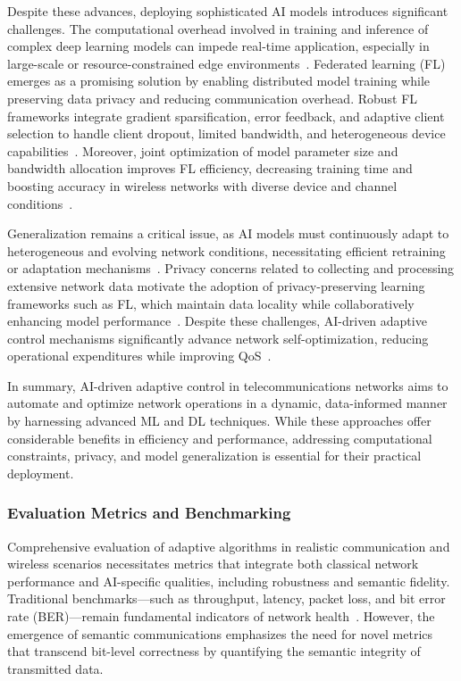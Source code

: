 \documentclass[sigconf]{acmart}
\begin{document}
Despite these advances, deploying sophisticated AI models introduces significant challenges. The computational overhead involved in training and inference of complex deep learning models can impede real-time application, especially in large-scale or resource-constrained edge environments~\cite{ref4,ref5}. Federated learning (FL) emerges as a promising solution by enabling distributed model training while preserving data privacy and reducing communication overhead. Robust FL frameworks integrate gradient sparsification, error feedback, and adaptive client selection to handle client dropout, limited bandwidth, and heterogeneous device capabilities~\cite{ref4}. Moreover, joint optimization of model parameter size and bandwidth allocation improves FL efficiency, decreasing training time and boosting accuracy in wireless networks with diverse device and channel conditions~\cite{ref5}. 

Generalization remains a critical issue, as AI models must continuously adapt to heterogeneous and evolving network conditions, necessitating efficient retraining or adaptation mechanisms~\cite{ref7}. Privacy concerns related to collecting and processing extensive network data motivate the adoption of privacy-preserving learning frameworks such as FL, which maintain data locality while collaboratively enhancing model performance~\cite{ref10,ref11}. Despite these challenges, AI-driven adaptive control mechanisms significantly advance network self-optimization, reducing operational expenditures while improving QoS~\cite{ref14,ref50}.

In summary, AI-driven adaptive control in telecommunications networks aims to automate and optimize network operations in a dynamic, data-informed manner by harnessing advanced ML and DL techniques. While these approaches offer considerable benefits in efficiency and performance, addressing computational constraints, privacy, and model generalization is essential for their practical deployment.

\subsubsection{Evaluation Metrics and Benchmarking}

Comprehensive evaluation of adaptive algorithms in realistic communication and wireless scenarios necessitates metrics that integrate both classical network performance and AI-specific qualities, including robustness and semantic fidelity. Traditional benchmarks---such as throughput, latency, packet loss, and bit error rate (BER)---remain fundamental indicators of network health~\cite{ref3,ref5}. However, the emergence of semantic communications emphasizes the need for novel metrics that transcend bit-level correctness by quantifying the semantic integrity of transmitted data.
\end{document}
